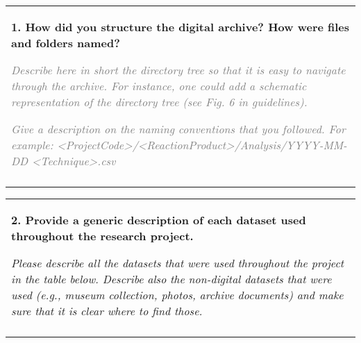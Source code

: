 \documentclass[12pt]{article}
\begin{document}



\newpage


\vspace{\baselineskip}{\fontsize{14pt}{16.8pt}\selectfont \textcolor[HTML]{BC0031}{Directory structure }\par}\par

\begin{table}[H]
 			\centering
\begin{tabular}{p{5.99in}}
\hline
\multicolumn{1}{|p{5.99in}|}{\textbf{1. How did you structure the digital archive? How were files and folders named?} 
\par \textit{\textcolor[HTML]{808080}{Describe here in short the directory tree so that it is easy to navigate through the archive. For instance, one could add a schematic representation of the directory tree (see Fig. 6 in guidelines).}} 
\par \textit{\textcolor[HTML]{808080}{Give a description on the naming conventions that you followed. For example: <ProjectCode>/<ReactionProduct>/Analysis/YYYY-MM-DD <Technique>.csv }}} \\ %
\hhline{-}
\end{tabular}
\end{table}



\newpage


\vspace{\baselineskip}{\fontsize{14pt}{16.8pt}\selectfont \textcolor[HTML]{BC0031}{Datasets and Analysis}\par}\par



\begin{table}[H]
 			\centering
\begin{tabular}{p{5.99in}}
\hline
\multicolumn{1}{|p{5.99in}|}{\textbf{2. Provide a generic description of each dataset used throughout the research project.} \par \textit{Please describe all the datasets that were used throughout the project in the table below. Describe also the non-digital datasets that were used (e.g., museum collection, photos, archive documents) and make sure that it is clear where to find those.}} \\ 
\hhline{-}
\end{tabular}
\end{table}
\end{document}
